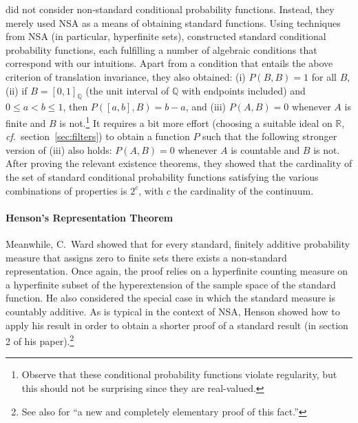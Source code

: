 \citeauthor{ParikhParnes:1974} did not consider non-standard conditional probability functions. Instead, they merely used NSA as a means of obtaining standard functions.
Using techniques from NSA (in particular, hyperfinite sets), \citeauthor{ParikhParnes:1974} constructed standard conditional probability functions, each fulfilling a number of algebraic conditions that correspond with our intuitions. Apart from a condition that entails the above criterion of translation invariance, they also obtained: (i) $P(B,B)=1$ for all $B$, (ii) if $B=[0,1]_\mathbb{Q}$ (the unit interval of $\mathbb{Q}$ with endpoints included) and $0 \leq a < b \leq 1$, then $P([a,b],B)=b-a$, and (iii) $P(A,B)=0$ whenever $A$ is finite and $B$ is not.\footnote{Observe that these conditional probability functions violate regularity, but this should not be surprising since they are real-valued.} It requires a bit more effort (choosing a suitable ideal on $\mathbb{R}$, \textit{cf.}\ section~\ref{sec:filters}) to obtain a function $P$ such that the following stronger version of (iii) also holds: $P(A,B)=0$ whenever $A$ is countable and $B$ is not.
After proving the relevant existence theorems, they showed that the cardinality of the set of standard conditional probability functions satisfying the various combinations of properties is $2^c$, with $c$ the cardinality of the continuum.

\paragraph{Henson's Representation Theorem}
Meanwhile, C.~Ward \citet{Henson:1972} showed that for every standard, finitely additive probability measure that assigns zero to finite sets there exists a non-standard representation. Once again, the proof relies on a hyperfinite counting measure on a hyperfinite subset of the hyperextension of the sample space of the standard function. He also considered the special case in which the standard measure is countably additive. As is typical in the context of NSA, Henson showed how to apply his result in order to obtain a shorter proof of a standard result (in section 2 of his paper).\footnote{See also \citet{HofweberSchindler:2016} for ``a new and completely elementary proof of this fact.''}

